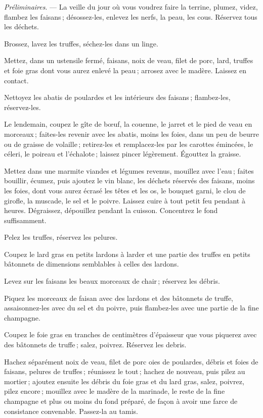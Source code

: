 \textit{Préliminaires}. — La veille du jour où vous voudrez faire la terrine,
plumez, videz, flambez les faisans ; désossez-les, enlevez les nerfs, la peau,
les cous. Réservez tous les déchets.

Brossez, lavez les truffes, séchez-les dans un linge.

Mettez, dans un ustensile fermé, faisans, noix de veau, filet de porc, lard,
truffes et foie gras dont vous aurez enlevé la peau ; arrosez avec le madère.
Laissez en contact.

Nettoyez les abatis de poulardes et les intérieurs des faisans ; flambez-les,
réservez-les.

\medskip

Le lendemain, coupez le gîte de bœuf, la couenne, le jarret et le pied de veau
en morceaux ; faites-les revenir avec les abatis, moins les foies, dans un peu
de beurre ou de graisse de volaille ; retirez-les et remplacez-les par les
carottes émincées, le céleri, le poireau et l'échalote ; laissez pincer
légèrement. Égouttez la graisse.

Mettez dans une marmite viandes et légumes revenus, mouillez avec l'eau ;
faites bouillir, écumez, puis ajoutez le vin blanc, les déchets réservés des
faisans, moins les foies, dont vous aurez écrasé les têtes et les os, le
bouquet garni, le clou de girofle, la muscade, le sel et le poivre. Laissez
cuire à tout petit feu pendant {\mmm} à {\mmm} heures. Dégraissez, dépouillez pendant la
cuisson. Concentrez le fond suffisamment.

Pelez les truffes, réservez les pelures.

Coupez le lard gras en petits lardons à larder et une partie des truffes en
petits bâtonnets de dimensions semblables à celles des lardons.

Levez sur les faisans les beaux morceaux de chair ; réservez les débris.

Piquez les morceaux de faisan avec des lardons et des bâtonnets de truffe,
assaisonnez-les avec du sel et du poivre, puis flambez-les avec une partie de
la fine champagne.

Coupez le foie gras en tranches de {\mmm} centimètres d'épaisseur que vous piquerez
avec des bâtonnets de truffe ; salez, poivrez. Réservez les debris.

Hachez séparément noix de veau, filet de porc oies de poulardes, débris et
foies de faisans, pelures de truffes ; réunissez le tout ; hachez de nouveau,
puis pilez au mortier ; ajoutez ensuite les débris du foie gras et du lard
gras, salez, poivrez, pilez encore ; mouillez avec le madère de la marinade, le
reste de la fine champagne et plus ou moins du fond préparé, de façon à avoir
une farce de consistance convenable. Passez-la au tamis.

